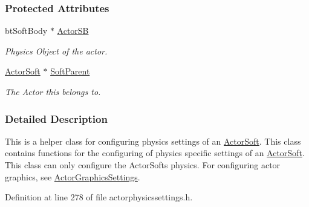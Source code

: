 \subsubsection*{Protected Attributes}
\begin{DoxyCompactItemize}
\item 
\hypertarget{classphys_1_1ActorSoftPhysicsSettings_a0258a8c8ab634b6dc26fd86e8edcc25c}{
btSoftBody $\ast$ \hyperlink{classphys_1_1ActorSoftPhysicsSettings_a0258a8c8ab634b6dc26fd86e8edcc25c}{ActorSB}}
\label{d0/d52/classphys_1_1ActorSoftPhysicsSettings_a0258a8c8ab634b6dc26fd86e8edcc25c}

\begin{DoxyCompactList}\small\item\em Physics Object of the actor. \item\end{DoxyCompactList}\item 
\hypertarget{classphys_1_1ActorSoftPhysicsSettings_a94194a1dd89e643b02181010fcad6bc3}{
\hyperlink{classphys_1_1ActorSoft}{ActorSoft} $\ast$ \hyperlink{classphys_1_1ActorSoftPhysicsSettings_a94194a1dd89e643b02181010fcad6bc3}{SoftParent}}
\label{d0/d52/classphys_1_1ActorSoftPhysicsSettings_a94194a1dd89e643b02181010fcad6bc3}

\begin{DoxyCompactList}\small\item\em The Actor this belongs to. \item\end{DoxyCompactList}\end{DoxyCompactItemize}


\subsubsection{Detailed Description}
This is a helper class for configuring physics settings of an \hyperlink{classphys_1_1ActorSoft}{ActorSoft}. This class contains functions for the configuring of physics specific settings of an \hyperlink{classphys_1_1ActorSoft}{ActorSoft}. This class can only configure the ActorSofts physics. For configuring actor graphics, see \hyperlink{classphys_1_1ActorGraphicsSettings}{ActorGraphicsSettings}. 

Definition at line 278 of file actorphysicssettings.h.



